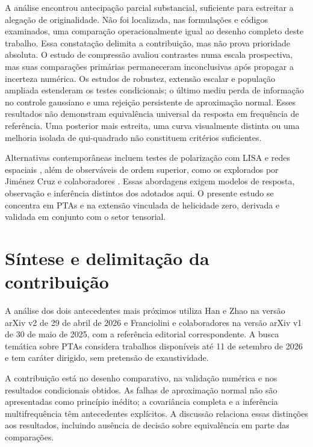 A análise encontrou antecipação parcial substancial, suficiente para
estreitar a alegação de originalidade. Não foi localizada, nas
formulações e códigos examinados, uma comparação operacionalmente
igual ao desenho completo deste trabalho. Essa constatação delimita
a contribuição, mas não prova prioridade absoluta. O estudo de compressão avaliou contrastes numa escala prospectiva, mas suas comparações primárias permaneceram inconclusivas após propagar a incerteza numérica. Os estudos de robustez, extensão escalar e população ampliada estenderam os testes condicionais; o último mediu perda de informação no controle gaussiano e uma rejeição persistente de aproximação normal. Esses resultados não demonstram equivalência universal da resposta em frequência de referência. Uma posterior mais
estreita, uma curva visualmente distinta ou uma melhoria isolada de
qui-quadrado não constituem critérios suficientes.

Alternativas contemporâneas incluem testes de polarização com LISA e
redes espaciais \autocite{akama2026,mu2026}, além de observáveis de
ordem superior, como os explorados por Jiménez Cruz e colaboradores
\autocite{jimenez2026}. Essas abordagens exigem modelos de resposta, observação e inferência distintos dos adotados aqui. O presente estudo se concentra em PTAs e na extensão vinculada de helicidade zero, derivada e validada em conjunto com o setor tensorial.

\section{Síntese e delimitação da contribuição}

A análise dos dois antecedentes mais próximos utiliza Han e Zhao na versão arXiv v2 de 29 de abril de 2026 e Franciolini e colaboradores na versão arXiv v1 de 30 de maio de 2025, com a referência editorial correspondente. A busca temática sobre PTAs considera trabalhos disponíveis até 11 de setembro de 2026 e tem caráter dirigido, sem pretensão de exaustividade.

A contribuição está no desenho comparativo, na validação numérica e nos resultados condicionais obtidos. As falhas de aproximação normal não são apresentadas como princípio inédito; a covariância completa e a inferência multifrequência têm antecedentes explícitos. A discussão relaciona essas distinções aos resultados, incluindo ausência de decisão sobre equivalência em parte das comparações.
